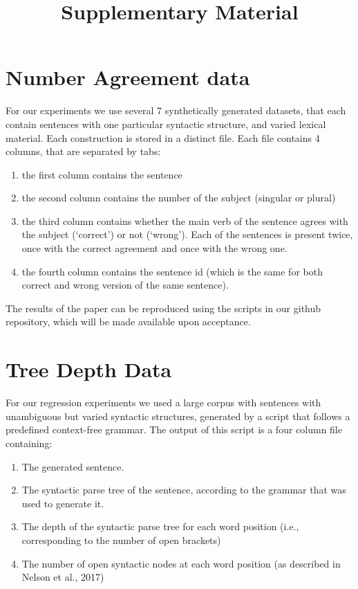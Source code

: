 \documentclass{article}
\title{Supplementary Material}
\date{}
\author{}
\begin{document}
\maketitle

\section*{Number Agreement data}

For our experiments we use several 7 synthetically generated datasets, that each contain sentences with one particular syntactic structure, and varied lexical material.
Each construction is stored in a distinct file.
Each file contains 4 columns, that are separated by tabs:\begin{enumerate}
    \item the first column contains the sentence
    \item the second column  contains the number of the subject (singular or plural)
    \item the third column contains whether the main verb of the sentence agrees with the subject (`correct') or not (`wrong'). Each of the sentences is present twice, once with the correct agreement and once with the wrong one.
    \item the fourth column contains the sentence id (which is the same for both correct and wrong version of the same sentence).
\end{enumerate}

The results of the paper can be reproduced using the scripts in our github repository, which will be made available upon acceptance.

\section*{Tree Depth Data}

For our regression experiments we used a large corpus with sentences with unambiguous but varied syntactic structures, generated by a script that follows a predefined context-free grammar.
The output of this script is a four column file containing:\begin{enumerate}
    \item The generated sentence.
    \item The syntactic parse tree of the sentence, according to the grammar that was used to generate it.
    \item The depth of the syntactic parse tree for each word position (i.e., corresponding to the number of open brackets)
    \item The number of open syntactic nodes at each word position (as described in Nelson et al., 2017)
\end{enumerate}
\end{document}
